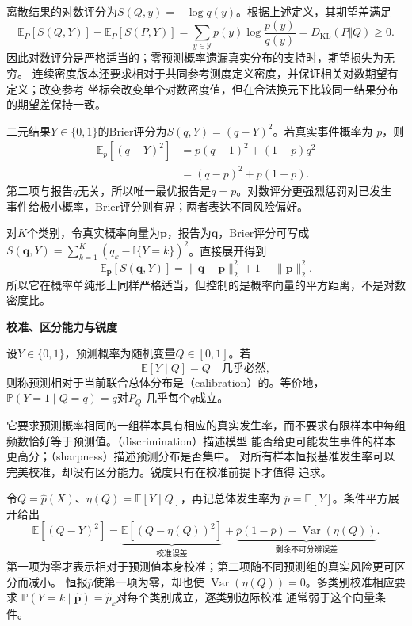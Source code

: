 离散结果的对数评分为\(S(Q,y)=-\log q(y)\)。根据上述定义，其期望差满足
\[
  \mathbb{E}_P[S(Q,Y)]-\mathbb{E}_P[S(P,Y)]
  =\sum_{y\in\mathcal Y}p(y)\log\frac{p(y)}{q(y)}
  =D_{\mathrm{KL}}(P\Vert Q)\geq0.
\]
因此对数评分是严格适当的；零预测概率遗漏真实分布的支持时，期望损失为无穷。
连续密度版本还要求相对于共同参考测度定义密度，并保证相关对数期望有定义；改变参考
坐标会改变单个对数密度值，但在合法换元下比较同一结果分布的期望差保持一致。

二元结果\(Y\in\{0,1\}\)的Brier评分为\(S(q,Y)=(q-Y)^2\)。若真实事件概率为
\(p\)，则
\begin{align}
  \mathbb{E}_p[(q-Y)^2]
  &=p(q-1)^2+(1-p)q^2\\
  &=(q-p)^2+p(1-p).
\end{align}
第二项与报告\(q\)无关，所以唯一最优报告是\(q=p\)。对数评分更强烈惩罚对已发生
事件给极小概率，Brier评分则有界；两者表达不同风险偏好。

对\(K\)个类别，令真实概率向量为\(\bm p\)，报告为\(\bm q\)，Brier评分可写成
\(S(\bm q,Y)=\sum_{k=1}^K(q_k-\mathbb{I}\{Y=k\})^2\)。直接展开得到
\[
  \mathbb{E}_{\bm p}[S(\bm q,Y)]
  =\lVert\bm q-\bm p\rVert_2^2
   +1-\lVert\bm p\rVert_2^2.
\]
所以它在概率单纯形上同样严格适当，但控制的是概率向量的平方距离，不是对数密度比。

\par\medskip\noindent\textbf{校准、区分能力与锐度}\quad
\begin{definition}[二元概率校准]
  \label{def:statistics-probability-calibration}
  设\(Y\in\{0,1\}\)，预测概率为随机变量\(Q\in[0,1]\)。若
  \[ \mathbb E[Y\mid Q]=Q\quad\text{几乎必然}, \]
  则称预测相对于当前联合总体分布是（calibration）的。等价地，\(\mathbb P(Y=1\mid Q=q)=q\)对\(P_Q\)-几乎每个\(q\)成立。
\end{definition}
它要求预测概率相同的一组样本具有相应的真实发生率，而不要求有限样本中每组频数恰好等于预测值。（discrimination）描述模型
能否给更可能发生事件的样本更高分；（sharpness）描述预测分布是否集中。
对所有样本恒报基准发生率可以完美校准，却没有区分能力。锐度只有在校准前提下才值得
追求。

令\(Q=\widehat p(X)\)、\(\eta(Q)=\mathbb{E}[Y\mid Q]\)，再记总体发生率为
\(\overline p=\mathbb{E}[Y]\)。条件平方展开给出
\[
  \mathbb{E}[(Q-Y)^2]
  =
  \underbrace{\mathbb{E}[(Q-\eta(Q))^2]}_{\text{校准误差}}
  +\underbrace{\overline p(1-\overline p)
    -\operatorname{Var}(\eta(Q))}_{\text{剩余不可分辨误差}}.
\]
第一项为零才表示相对于预测值本身校准；第二项随不同预测组的真实风险更可区分而减小。
恒报\(\overline p\)使第一项为零，却也使
\(\operatorname{Var}(\eta(Q))=0\)。多类别校准相应要求
\(\mathbb{P}(Y=k\mid\widehat{\bm p})=\widehat p_k\)对每个类别成立，逐类别边际校准
通常弱于这个向量条件。

